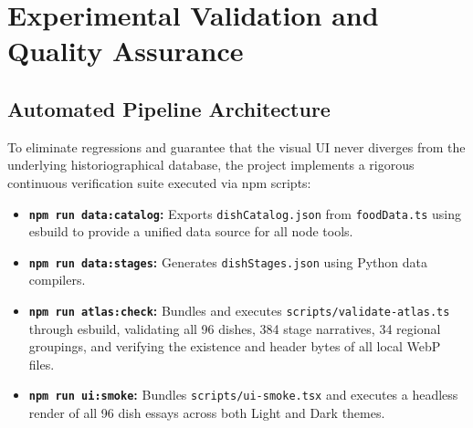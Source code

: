 \documentclass[11pt,a4paper]{report}
\begin{document}
\chapter{Experimental Validation and Quality Assurance}

\section{Automated Pipeline Architecture}
To eliminate regressions and guarantee that the visual UI never diverges from the underlying historiographical database, the project implements a rigorous continuous verification suite executed via npm scripts:
\begin{itemize}
    \item \textbf{\texttt{npm run data:catalog}:} Exports \texttt{dishCatalog.json} from \texttt{foodData.ts} using esbuild to provide a unified data source for all node tools.
    \item \textbf{\texttt{npm run data:stages}:} Generates \texttt{dishStages.json} using Python data compilers.
    \item \textbf{\texttt{npm run atlas:check}:} Bundles and executes \texttt{scripts/validate-atlas.ts} through esbuild, validating all 96 dishes, 384 stage narratives, 34 regional groupings, and verifying the existence and header bytes of all local WebP files.
    \item \textbf{\texttt{npm run ui:smoke}:} Bundles \texttt{scripts/ui-smoke.tsx} and executes a headless render of all 96 dish essays across both Light and Dark themes.
\end{itemize}
\end{document}
